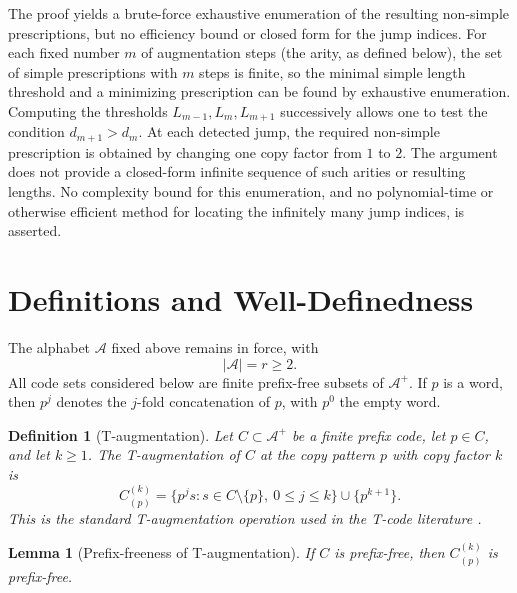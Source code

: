 \documentclass[11pt]{article}
\newtheorem{lemma}{Lemma}
\newtheorem{definition}{Definition}
\newcommand{\A}{\mathcal A}
\begin{document}
The proof yields a brute-force exhaustive enumeration of the resulting non-simple prescriptions, but no efficiency bound or closed form for the jump indices.
For each fixed number $m$ of augmentation steps (the arity, as defined below), the set of simple prescriptions with $m$ steps is finite, so the minimal simple length threshold and a minimizing prescription can be found by exhaustive enumeration.
Computing the thresholds \(L_{m-1},L_m,L_{m+1}\) successively
allows one to test the condition \(d_{m+1}>d_m\).
At each detected jump, the required non-simple prescription is obtained by changing one copy factor from $1$ to $2$. The argument does not provide a closed-form infinite sequence of such arities or resulting lengths. No complexity bound for this enumeration, and no polynomial-time or otherwise efficient method for locating the infinitely many jump indices, is asserted.

\section{Definitions and Well-Definedness}

The alphabet $\A$ fixed above remains in force, with
\begin{equation}
|\A|=r\geq 2.
\end{equation}
All code sets considered below are finite prefix-free subsets of $\A^+$. If $p$ is a word, then $p^j$ denotes the $j$-fold concatenation of $p$, with $p^0$ the empty word.

\begin{definition}[T-augmentation]
Let $C\subset \A^+$ be a finite prefix code, let $p\in C$, and let $k\geq 1$. The T-augmentation of $C$ at the copy pattern $p$ with copy factor $k$ is
\begin{equation}
C_{(p)}^{(k)}=\bigl\{p^j s:s\in C\setminus\{p\},\ 0\leq j\leq k\bigr\}\cup\bigl\{p^{k+1}\bigr\}.
\end{equation}
This is the standard T-augmentation operation used in the T-code literature \cite{TitchenerEtAl2005,NicolescuTitchener1998,Guenther1998}.
\end{definition}

\begin{lemma}[Prefix-freeness of T-augmentation]
\label{lem:prefixfree}
If $C$ is prefix-free, then $C_{(p)}^{(k)}$ is prefix-free.
\end{lemma}
\end{document}
